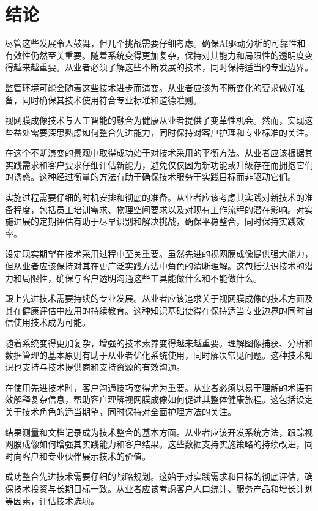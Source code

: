 \documentclass[
  Letterpaper,
]{scrbook}
\begin{document}
\section{结论}\label{ux7ed3ux8bba-3}

尽管这些发展令人鼓舞，但几个挑战需要仔细考虑。确保AI驱动分析的可靠性和有效性仍然至关重要。随着系统变得更加复杂，保持对其能力和局限性的透明度变得越来越重要。从业者必须了解这些不断发展的技术，同时保持适当的专业边界。

监管环境可能会随着这些技术进步而演变。从业者应该为不断变化的要求做好准备，同时确保其技术使用符合专业标准和道德准则。

视网膜成像技术与人工智能的融合为健康从业者提供了变革性机会。然而，实现这些益处需要深思熟虑如何整合先进能力，同时保持对客户护理和专业标准的关注。

在这个不断演变的景观中取得成功始于对技术采用的平衡方法。从业者应该根据其实践需求和客户要求仔细评估新能力，避免仅仅因为新功能或升级存在而拥抱它们的诱惑。这种经过衡量的方法有助于确保技术服务于实践目标而非驱动它们。

实施过程需要仔细的时机安排和彻底的准备。从业者应该考虑其实践对新技术的准备程度，包括员工培训需求、物理空间要求以及对现有工作流程的潜在影响。对实施进展的定期评估有助于尽早识别和解决挑战，确保平稳整合，同时保持实践效率。

设定现实期望在技术采用过程中至关重要。虽然先进的视网膜成像提供强大能力，但从业者应该保持对其在更广泛实践方法中角色的清晰理解。这包括认识技术的潜力和局限性，确保与客户透明沟通这些工具能做什么和不能做什么。

跟上先进技术需要持续的专业发展。从业者应该追求关于视网膜成像的技术方面及其在健康评估中应用的持续教育。这种知识基础使得在保持适当专业边界的同时自信使用技术成为可能。

随着系统变得更加复杂，增强的技术素养变得越来越重要。理解图像捕获、分析和数据管理的基本原则有助于从业者优化系统使用，同时解决常见问题。这种技术知识也支持与技术提供商和支持资源的有效沟通。

在使用先进技术时，客户沟通技巧变得尤为重要。从业者必须以易于理解的术语有效解释复杂信息，帮助客户理解视网膜成像如何促进其整体健康旅程。这包括设定关于技术角色的适当期望，同时保持对全面护理方法的关注。

结果测量和文档记录成为技术整合的基本方面。从业者应该开发系统方法，跟踪视网膜成像如何增强其实践能力和客户结果。这些数据支持实施策略的持续改进，同时向客户和专业伙伴展示技术的价值。

成功整合先进技术需要仔细的战略规划。这始于对实践需求和目标的彻底评估，确保技术投资与长期目标一致。从业者应该考虑客户人口统计、服务产品和增长计划等因素，评估技术选项。
\end{document}
